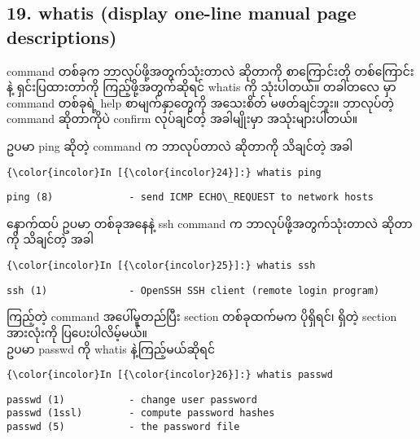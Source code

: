 \documentclass[11pt]{article}
\begin{document}
    \subsection{19. whatis (display one-line manual page
descriptions)}\label{whatis-display-one-line-manual-page-descriptions}

command တစ်ခုက ဘာလုပ်ဖို့အတွက်သုံးတာလဲ ဆိုတာကို စာကြောင်းတို
တစ်ကြောင်းနဲ့ ရှင်းပြထားတာကို ကြည့်ဖို့အတွက်ဆိုရင် whatis ကို သုံးပါတယ်။
တခါတလေ မှာ command တစ်ခုရဲ့ help စာမျက်နှာတွေကို အသေးစိတ် မဖတ်ချင်ဘူး။
ဘာလုပ်တဲ့ command ဆိုတာကိုပဲ confirm လုပ်ချင်တဲ့ အခါမျိုးမှာ
အသုံးများပါတယ်။

ဥပမာ ping ဆိုတဲ့ command က ဘာလုပ်တာလဲ ဆိုတာကို သိချင်တဲ့ အခါ

    \begin{Verbatim}[commandchars=\\\{\}]
{\color{incolor}In [{\color{incolor}24}]:} whatis ping
\end{Verbatim}

    \begin{Verbatim}[commandchars=\\\{\}]
ping (8)             - send ICMP ECHO\_REQUEST to network hosts

    \end{Verbatim}

    နောက်ထပ် ဥပမာ တစ်ခုအနေနဲ့ ssh command က ဘာလုပ်ဖို့အတွက်သုံးတာလဲ ဆိုတာကို
သိချင်တဲ့ အခါ

    \begin{Verbatim}[commandchars=\\\{\}]
{\color{incolor}In [{\color{incolor}25}]:} whatis ssh
\end{Verbatim}

    \begin{Verbatim}[commandchars=\\\{\}]
ssh (1)              - OpenSSH SSH client (remote login program)

    \end{Verbatim}

    ကြည့်တဲ့ command အပေါ်မူတည်ပြီး section တစ်ခုထက်မက ပိုရှိရင်၊ ရှိတဲ့
section အားလုံးကို ပြပေးပါလိမ့်မယ်။\\
ဥပမာ passwd ကို whatis နဲ့ကြည့်မယ်ဆိုရင်

    \begin{Verbatim}[commandchars=\\\{\}]
{\color{incolor}In [{\color{incolor}26}]:} whatis passwd
\end{Verbatim}

    \begin{Verbatim}[commandchars=\\\{\}]
passwd (1)           - change user password
passwd (1ssl)        - compute password hashes
passwd (5)           - the password file

    \end{Verbatim}
\end{document}
